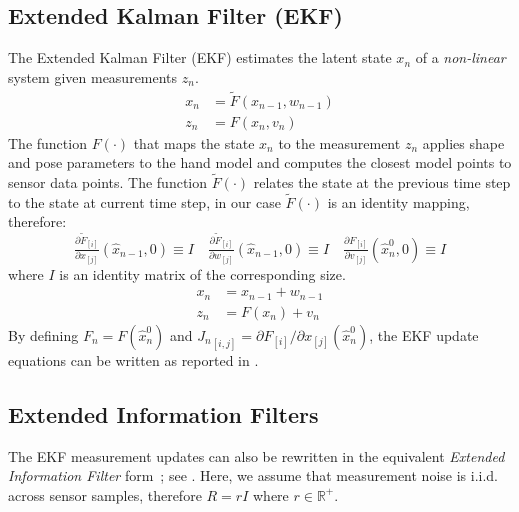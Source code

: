 \subsection{Extended Kalman Filter (EKF)}
\label{app:ekf}
The Extended Kalman Filter (EKF) estimates the latent state $x_n$ of a \emph{non-linear} system given measurements $z_n$.
% 
\begin{align}
x_n &= \tilde{F}(x_{n - 1},  w_{n - 1}) \\
z_n &= F(x_n, v_n)
\end{align}
% 
The function $F(\cdot)$ that maps the state $x_n$ to the measurement $z_n$ applies shape and pose parameters to the hand model and computes the closest model points to sensor data points. 
The function $\tilde{F}(\cdot)$ relates the state at the previous time step to the state at current time step, in our case $\tilde{F}(\cdot)$ is an identity mapping, therefore:
\begin{equation*}
\tfrac{ \partial \tilde{F}_{[i]}}{ \partial x_{[j]}}(\hat{x}_{n - 1}, 0) \equiv I
\quad
\tfrac{ \partial \tilde{F}_{[i]}}{ \partial w_{[j]}}(\hat{x}_{n - 1}, 0) \equiv I
\quad
\tfrac{ \partial F_{[i]}}{ \partial v_{[j]}}(\hat{x}_n^0, 0) \equiv I
\end{equation*}
% 
where $I$ is an identity matrix of the corresponding size.
% 
% 
\begin{align}
x_n &= x_{n - 1} + w_{n - 1} \\
z_n &= F(x_n) + v_n 
\end{align}
%
By defining $F_n = F(\hat{x}_n^0)$ and ${J_n}_{[i, j]} = \partial F_{[i]} / \partial x_{[j]}(\hat{x}_n^0)$, the EKF update equations can be written as reported in .
%


\subsection{Extended Information Filters}
\label{app:eif}
The EKF measurement updates can also be rewritten in the equivalent \emph{Extended Information Filter} form~\cite{optimal}; see . Here, we assume that measurement noise is i.i.d. across sensor samples, therefore $R=rI$ where $r\in \mathbb{R}^+$. 


